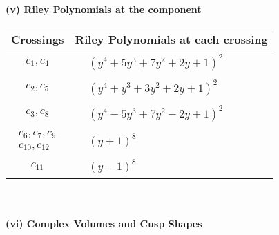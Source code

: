 \documentclass[1p]{elsarticle_modified}
\theoremstyle{definition}
\begin{document}
\newpage\renewcommand{\arraystretch}{1}
\flushleft \textbf{(v) Riley Polynomials at the component}\newline \\
\begin{tabular}{m{50pt}|m{274pt}}
Crossings & \hspace{64pt}Riley Polynomials at each crossing \\
\hline $$\begin{aligned}c_{1},c_{4}\end{aligned}$$&$\begin{aligned}
&(y^4+5 y^3+7 y^2+2 y+1)^2
\end{aligned}$\\
\hline $$\begin{aligned}c_{2},c_{5}\end{aligned}$$&$\begin{aligned}
&(y^4+y^3+3 y^2+2 y+1)^2
\end{aligned}$\\
\hline $$\begin{aligned}c_{3},c_{8}\end{aligned}$$&$\begin{aligned}
&(y^4-5 y^3+7 y^2-2 y+1)^2
\end{aligned}$\\
\hline $$\begin{aligned}c_{6},c_{7},c_{9}\\c_{10},c_{12}\end{aligned}$$&$\begin{aligned}
&(y+1)^8
\end{aligned}$\\
\hline $$\begin{aligned}c_{11}\end{aligned}$$&$\begin{aligned}
&(y-1)^8
\end{aligned}$\\
\hline
\end{tabular}\\~\\
\newpage\flushleft \textbf{(vi) Complex Volumes and Cusp Shapes}
\end{document}
